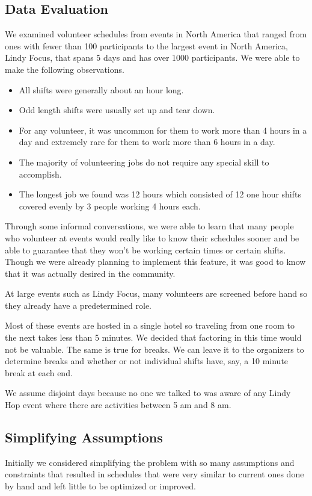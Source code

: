 \documentclass[11pt]{article}
\theoremstyle{definition}
\begin{document}
\begin{multicols}{2}
\section{Data Evaluation}
We examined volunteer schedules from events in North America that ranged from ones with fewer than 100 participants to the largest event in North America, Lindy Focus, that spans 5 days and has over 1000 participants.
We were able to make the following observations.
\begin{itemize}\itemsep0pt
\item All shifts were generally about an hour long.
\item Odd length shifts were usually set up and tear down.
\item For any volunteer, it was uncommon for them to work more than 4 hours in a day and extremely rare for them to work more than 6 hours in a day.
\item The majority of volunteering jobs do not require any special skill to accomplish.
\item The longest job we found was 12 hours which consisted of 12 one hour shifts covered evenly by 3 people working 4 hours each.
\end{itemize}

Through some informal conversations, we were able to learn that many people who volunteer at events would really like to know their schedules sooner and be able to guarantee that they won't be working certain times or certain shifts.
Though we were already planning to implement this feature, it was good to know that it was actually desired in the community.

At large events such as Lindy Focus, many volunteers are screened before hand so they already have a predetermined role.

Most of these events are hosted in a single hotel so traveling from one room to the next takes less than 5 minutes.
We decided that factoring in this time would not be valuable.
The same is true for breaks.
We can leave it to the organizers to determine breaks and whether or not individual shifts have, say, a 10 minute break at each end.

We assume disjoint days because no one we talked to was aware of any Lindy Hop event where there are activities between 5 am and 8 am.

\subsection{Simplifying Assumptions}
Initially we considered simplifying the problem with so many assumptions and constraints that resulted in schedules that were very similar to current ones done by hand and left little to be optimized or improved.


\end{multicols}
\end{document}
